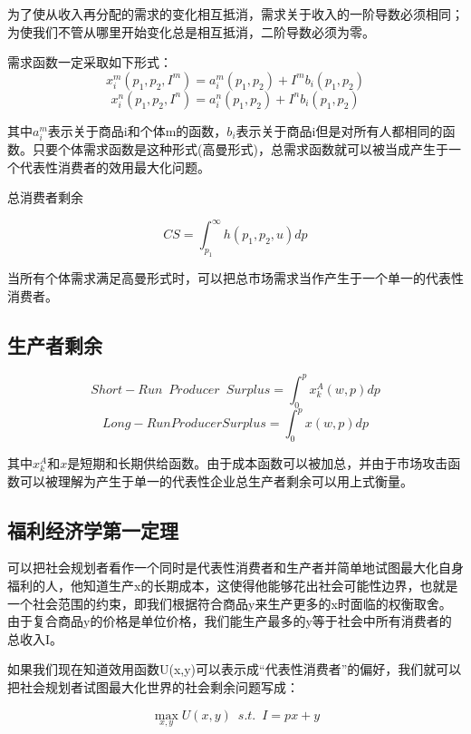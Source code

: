 \documentclass{article}
\begin{document}
为了使从收入再分配的需求的变化相互抵消，需求关于收入的一阶导数必须相同；为使我们不管从哪里开始变化总是相互抵消，二阶导数必须为零。

需求函数一定采取如下形式：
\[
x^m_i(p_1,p_2,I^m)=a_i^m(p_1,p_2)+I^mb_i(p_1,p_2)
\]
\[
x^n_i(p_1,p_2,I^n)=a_i^n(p_1,p_2)+I^nb_i(p_1,p_2)
\]

其中$ a_i^m $表示关于商品i和个体m的函数，$ b_i $表示关于商品i但是对所有人都相同的函数。只要个体需求函数是这种形式(高曼形式)，总需求函数就可以被当成产生于一个代表性消费者的效用最大化问题。

\hspace*{\fill}

总消费者剩余

\[
CS=\int_{p_1}^{\infty}h(p_1,p_2,u)dp
\]

当所有个体需求满足高曼形式时，可以把总市场需求当作产生于一个单一的代表性消费者。

\subsection{生产者剩余}

\[
Short-Run\enspace Producer\enspace Surplus=\int_{0}^{p}x_k^A(w,p)dp
\]
\[
Long-Run Producer Surplus=\int_{0}^{p}x(w,p)dp
\]

其中$ x_k^A $和$ x $是短期和长期供给函数。由于成本函数可以被加总，并由于市场攻击函数可以被理解为产生于单一的代表性企业总生产者剩余可以用上式衡量。

\subsection{福利经济学第一定理}

可以把社会规划者看作一个同时是代表性消费者和生产者并简单地试图最大化自身福利的人，他知道生产x的长期成本，这使得他能够花出社会可能性边界，也就是一个社会范围的约束，即我们根据符合商品y来生产更多的x时面临的权衡取舍。由于复合商品y的价格是单位价格，我们能生产最多的y等于社会中所有消费者的总收入I。

如果我们现在知道效用函数U(x,y)可以表示成“代表性消费者”的偏好，我们就可以把社会规划者试图最大化世界的社会剩余问题写成：

\[
\max\limits_{x,y}U(x,y)\enspace s.t. \enspace I=px+y
\]

	
\end{document}
